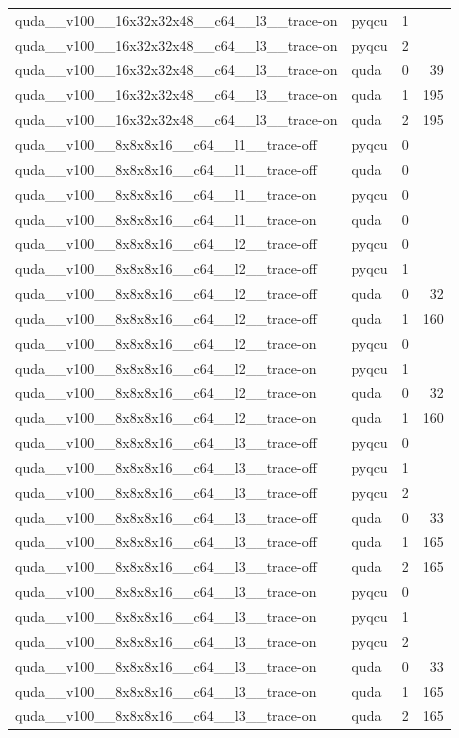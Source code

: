 \begin{table}[htbp]
\begin{tabular}{@{}llrr@{}}
quda\_\_v100\_\_16x32x32x48\_\_c64\_\_l3\_\_trace-on & pyqcu & 1 &  \\
quda\_\_v100\_\_16x32x32x48\_\_c64\_\_l3\_\_trace-on & pyqcu & 2 &  \\
quda\_\_v100\_\_16x32x32x48\_\_c64\_\_l3\_\_trace-on & quda & 0 & 39 \\
quda\_\_v100\_\_16x32x32x48\_\_c64\_\_l3\_\_trace-on & quda & 1 & 195 \\
quda\_\_v100\_\_16x32x32x48\_\_c64\_\_l3\_\_trace-on & quda & 2 & 195 \\
quda\_\_v100\_\_8x8x8x16\_\_c64\_\_l1\_\_trace-off & pyqcu & 0 &  \\
quda\_\_v100\_\_8x8x8x16\_\_c64\_\_l1\_\_trace-off & quda & 0 &  \\
quda\_\_v100\_\_8x8x8x16\_\_c64\_\_l1\_\_trace-on & pyqcu & 0 &  \\
quda\_\_v100\_\_8x8x8x16\_\_c64\_\_l1\_\_trace-on & quda & 0 &  \\
quda\_\_v100\_\_8x8x8x16\_\_c64\_\_l2\_\_trace-off & pyqcu & 0 &  \\
quda\_\_v100\_\_8x8x8x16\_\_c64\_\_l2\_\_trace-off & pyqcu & 1 &  \\
quda\_\_v100\_\_8x8x8x16\_\_c64\_\_l2\_\_trace-off & quda & 0 & 32 \\
quda\_\_v100\_\_8x8x8x16\_\_c64\_\_l2\_\_trace-off & quda & 1 & 160 \\
quda\_\_v100\_\_8x8x8x16\_\_c64\_\_l2\_\_trace-on & pyqcu & 0 &  \\
quda\_\_v100\_\_8x8x8x16\_\_c64\_\_l2\_\_trace-on & pyqcu & 1 &  \\
quda\_\_v100\_\_8x8x8x16\_\_c64\_\_l2\_\_trace-on & quda & 0 & 32 \\
quda\_\_v100\_\_8x8x8x16\_\_c64\_\_l2\_\_trace-on & quda & 1 & 160 \\
quda\_\_v100\_\_8x8x8x16\_\_c64\_\_l3\_\_trace-off & pyqcu & 0 &  \\
quda\_\_v100\_\_8x8x8x16\_\_c64\_\_l3\_\_trace-off & pyqcu & 1 &  \\
quda\_\_v100\_\_8x8x8x16\_\_c64\_\_l3\_\_trace-off & pyqcu & 2 &  \\
quda\_\_v100\_\_8x8x8x16\_\_c64\_\_l3\_\_trace-off & quda & 0 & 33 \\
quda\_\_v100\_\_8x8x8x16\_\_c64\_\_l3\_\_trace-off & quda & 1 & 165 \\
quda\_\_v100\_\_8x8x8x16\_\_c64\_\_l3\_\_trace-off & quda & 2 & 165 \\
quda\_\_v100\_\_8x8x8x16\_\_c64\_\_l3\_\_trace-on & pyqcu & 0 &  \\
quda\_\_v100\_\_8x8x8x16\_\_c64\_\_l3\_\_trace-on & pyqcu & 1 &  \\
quda\_\_v100\_\_8x8x8x16\_\_c64\_\_l3\_\_trace-on & pyqcu & 2 &  \\
quda\_\_v100\_\_8x8x8x16\_\_c64\_\_l3\_\_trace-on & quda & 0 & 33 \\
quda\_\_v100\_\_8x8x8x16\_\_c64\_\_l3\_\_trace-on & quda & 1 & 165 \\
quda\_\_v100\_\_8x8x8x16\_\_c64\_\_l3\_\_trace-on & quda & 2 & 165 \\
\bottomrule
\end{tabular}
\end{table}

